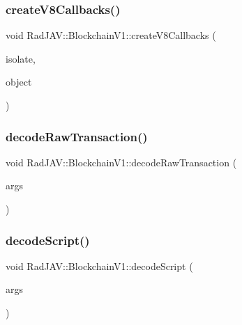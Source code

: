 \subsubsection{\texorpdfstring{create\+V8\+Callbacks()}{createV8Callbacks()}}
{\footnotesize\ttfamily void Rad\+J\+A\+V\+::\+Blockchain\+V1\+::create\+V8\+Callbacks (\begin{DoxyParamCaption}\item[{v8\+::\+Isolate $\ast$}]{isolate,  }\item[{v8\+::\+Local$<$ v8\+::\+Object $>$}]{object }\end{DoxyParamCaption})\hspace{0.3cm}{\ttfamily [static]}}

\mbox{\label{class_rad_j_a_v_1_1_blockchain_v1_ac3a54801ca2be8230a1e53f62c4a832f}} 
\subsubsection{\texorpdfstring{decode\+Raw\+Transaction()}{decodeRawTransaction()}}
{\footnotesize\ttfamily void Rad\+J\+A\+V\+::\+Blockchain\+V1\+::decode\+Raw\+Transaction (\begin{DoxyParamCaption}\item[{const v8\+::\+Function\+Callback\+Info$<$ v8\+::\+Value $>$ \&}]{args }\end{DoxyParamCaption})\hspace{0.3cm}{\ttfamily [static]}}

\mbox{\label{class_rad_j_a_v_1_1_blockchain_v1_aa4cfd6ed6fd748c4819a5b0eca15160e}} 
\subsubsection{\texorpdfstring{decode\+Script()}{decodeScript()}}
{\footnotesize\ttfamily void Rad\+J\+A\+V\+::\+Blockchain\+V1\+::decode\+Script (\begin{DoxyParamCaption}\item[{const v8\+::\+Function\+Callback\+Info$<$ v8\+::\+Value $>$ \&}]{args }\end{DoxyParamCaption})\hspace{0.3cm}{\ttfamily [static]}}

